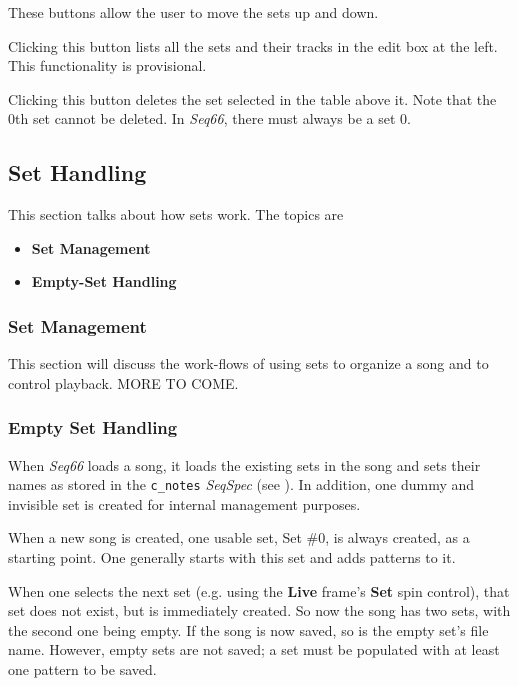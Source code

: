    These buttons allow the user to move the sets up and down.

   Clicking this button lists all the sets and their tracks in the edit box at
   the left. This functionality is provisional.

   Clicking this button deletes the set selected in the table above it.
   Note that the 0th set cannot be deleted.
   In \textsl{Seq66}, there must always be a set 0.

\subsection{Set Handling}
\label{subsec:setmaster_handling}

   This section talks about how sets work.  The topics are

   \begin{itemize}
      \item \textbf{Set Management}
      \item \textbf{Empty-Set Handling}
   \end{itemize}

\subsubsection{Set Management}
\label{subsubsec:setmaster_management}

   This section will discuss the work-flows of using sets to organize a song
   and to control playback.  MORE TO COME.

\subsubsection{Empty Set Handling}
\label{subsubsec:setmaster_empty_sets}

   When \textsl{Seq66} loads a song, it loads the existing sets in the song and
   sets their names as stored in the \texttt{c\_notes} \textsl{SeqSpec}
   (see ).
   In addition, one dummy and invisible set is created for internal management
   purposes.

   When a new song is created, one usable set, Set \#0, is always created, as a
   starting point.  One generally starts with this set and adds patterns to it.

   When one selects the next set (e.g. using the \textbf{Live} frame's
   \textbf{Set} spin control), that set does not exist, but is immediately
   created.  So now the song has two sets, with the second one being empty.
   If the song is now saved, so is the empty set's file name.  However, empty
   sets are not saved; a set must be populated with at least one pattern to be
   saved.

